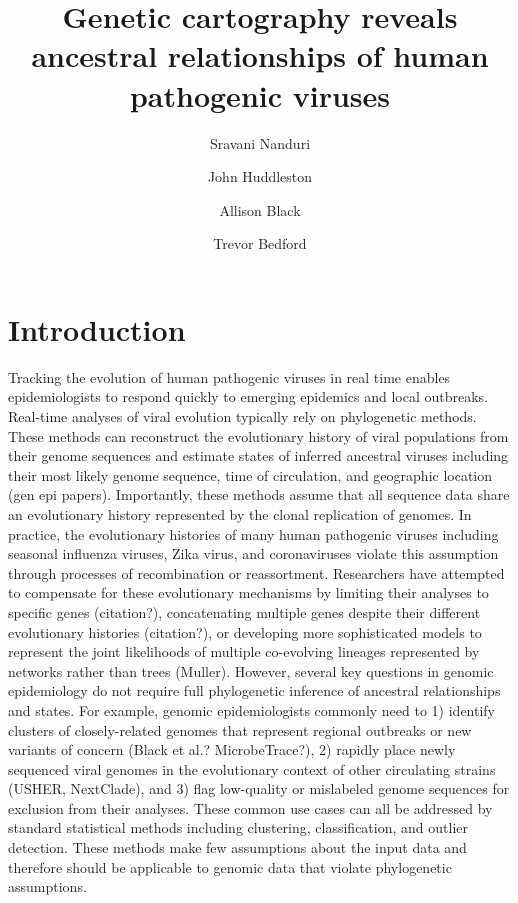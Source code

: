 \documentclass[9pt,lineno]{elife}
\title{Genetic cartography reveals ancestral relationships of human pathogenic viruses}
\author[1]{Sravani Nanduri}
\author[2]{John Huddleston}
\author[2]{Allison Black}
\author[2*]{Trevor Bedford}
\affil[1]{Issaquah High School, Issaquah, WA, USA}
\affil[2]{Vaccine and Infectious Disease Division, Fred Hutchinson Cancer Research Center, Seattle, WA, USA}
\date{}
\begin{document}
\maketitle

\begin{abstract}
\end{abstract}

\section*{Introduction}

Tracking the evolution of human pathogenic viruses in real time enables epidemiologists to respond quickly to emerging epidemics and local outbreaks.
Real-time analyses of viral evolution typically rely on phylogenetic methods.
These methods can reconstruct the evolutionary history of viral populations from their genome sequences and estimate states of inferred ancestral viruses including their most likely genome sequence, time of circulation, and geographic location (gen epi papers).
Importantly, these methods assume that all sequence data share an evolutionary history represented by the clonal replication of genomes.
In practice, the evolutionary histories of many human pathogenic viruses including seasonal influenza viruses, Zika virus, and coronaviruses violate this assumption through processes of recombination or reassortment.
Researchers have attempted to compensate for these evolutionary mechanisms by limiting their analyses to specific genes (citation?), concatenating multiple genes despite their different evolutionary histories (citation?), or developing more sophisticated models to represent the joint likelihoods of multiple co-evolving lineages represented by networks rather than trees (Muller).
However, several key questions in genomic epidemiology do not require full phylogenetic inference of ancestral relationships and states.
For example, genomic epidemiologists commonly need to 1) identify clusters of closely-related genomes that represent regional outbreaks or new variants of concern (Black et al.? MicrobeTrace?), 2) rapidly place newly sequenced viral genomes in the evolutionary context of other circulating strains (USHER, NextClade), and 3) flag low-quality or mislabeled genome sequences for exclusion from their analyses.
These common use cases can all be addressed by standard statistical methods including clustering, classification, and outlier detection.
These methods make few assumptions about the input data and therefore should be applicable to genomic data that violate phylogenetic assumptions.
\end{document}
